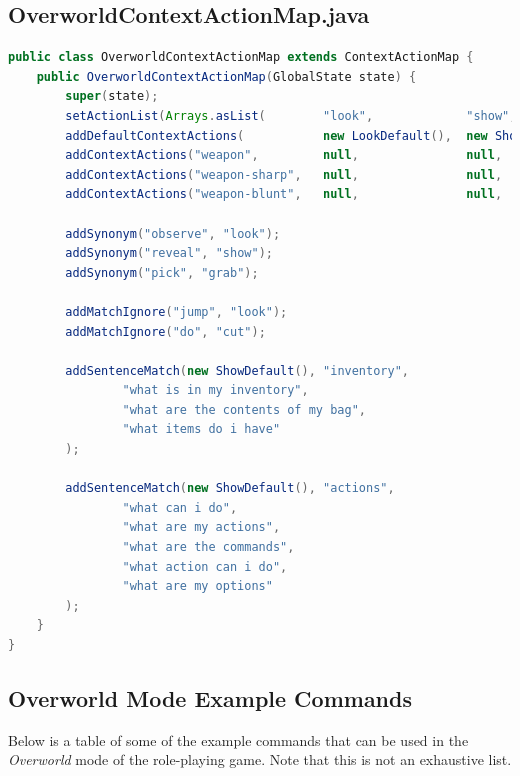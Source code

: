 \documentclass[11pt]{article}
\begin{document}
\subsection{OverworldContextActionMap.java}
\label{appendix:overworld-context-action-map}
\begin{lstlisting}[language=Java, caption=OverworldContextActionMap]
public class OverworldContextActionMap extends ContextActionMap {
    public OverworldContextActionMap(GlobalState state) {
        super(state);
        setActionList(Arrays.asList(        "look",             "show",             "grab",             "open",             "cut",                      "break"));
        addDefaultContextActions(           new LookDefault(),  new ShowDefault(),  new GrabObject(),   new OpenObject(),   new CutDefault(),           new BreakDefault());
        addContextActions("weapon",         null,               null,               new GrabObject(),   new OpenObject(),   new CutWeaponNotSharp(),    new BreakWeaponNotBlunt());
        addContextActions("weapon-sharp",   null,               null,               new GrabObject(),   new OpenObject(),   new CutWeaponSharp(),       new BreakWeaponNotBlunt());
        addContextActions("weapon-blunt",   null,               null,               new GrabObject(),   new OpenObject(),   new CutWeaponNotSharp(),    new BreakWeaponBlunt());

        addSynonym("observe", "look");
        addSynonym("reveal", "show");
        addSynonym("pick", "grab");

        addMatchIgnore("jump", "look");
        addMatchIgnore("do", "cut");

        addSentenceMatch(new ShowDefault(), "inventory",
                "what is in my inventory",
                "what are the contents of my bag",
                "what items do i have"
        );

        addSentenceMatch(new ShowDefault(), "actions",
                "what can i do",
                "what are my actions",
                "what are the commands",
                "what action can i do",
                "what are my options"
        );
    }
}
\end{lstlisting}

\newpage
\subsection{Overworld Mode Example Commands}
\label{appendix:overworld-examples}

Below is a table of some of the example commands that can be used in the \textit{Overworld} mode of the role-playing game. Note that this is not an exhaustive list.
\end{document}
